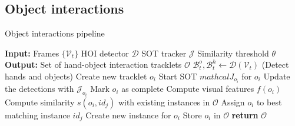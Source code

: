 \subsection*{Object interactions}
\begin{algorithm}[H]
    \caption{Object interactions pipeline}
    \begin{algorithmic}[1]
    \State \textbf{Input:}
    \State \quad Frames $\{\mathcal{V}_t\}$
    \State \quad HOI detector $\mathcal{D}$
    \State \quad SOT tracker $\mathcal{J}$
    \State \quad Similarity threshold $\theta$
    \State \textbf{Output:}
    \State \quad Set of hand-object interaction tracklets $\mathcal{O}$
        \State $\mathcal{B}_t^o, \mathcal{B}_t^h \gets \mathcal{D}(\mathcal{V}_t)$ (Detect hands and objects)
                \State Create new tracklet $o_i$
                \State Start SOT $mathcal{J}_{o_i}$ for $o_i$
            \EndIf
        \EndFor
            \State Update the detections with $\mathcal{J}_{o_i}$
                \State Mark $o_i$ as complete
            \EndIf
        \EndFor
    \EndFor
        \State Compute visual features $f(o_i)$
        \State Compute similarity $s(o_i, id_j)$ with existing instances in $\mathcal{O}$
            \State Assign $o_i$ to best matching instance $id_j$
        \Else
            \State Create new instance for $o_i$
        \EndIf
        \State Store $o_i$ in $\mathcal{O}$
    \EndFor
    \State \textbf{return} $\mathcal{O}$
    \end{algorithmic}
\end{algorithm}

